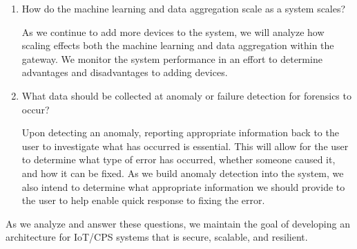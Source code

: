 \documentclass[../main.tex]{subfiles}
\begin{document}
\begin{enumerate}
    \item How do the machine learning and data aggregation scale as a system scales?

As we continue to add more devices to the system, we will analyze how scaling effects both the machine learning and data aggregation within the gateway. We monitor the system performance in an effort to determine advantages and disadvantages to adding devices. 
    
    
    \item What data should be collected at anomaly or failure detection for forensics to occur?
    
Upon detecting an anomaly, reporting appropriate information back to the user to investigate what has occurred is essential. This will allow for the user to determine what type of error has occurred, whether someone caused it, and how it can be fixed. As we build anomaly detection into the system, we also intend to determine what appropriate information we should provide to the user to help enable quick response to fixing the error.
    


\end{enumerate}


As we analyze and answer these questions, we maintain the goal of developing an architecture for IoT/CPS systems that is secure, scalable, and resilient. 
\end{document}
